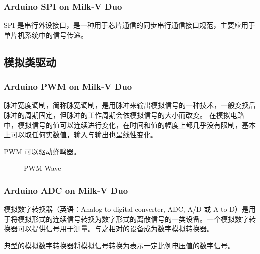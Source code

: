 \documentclass[xcolor=table,dvipsnames,svgnames,aspectratio=169]{ctexbeamer}
\begin{document}
\begin{frame}
  \frametitle{Arduino SPI on Milk-V Duo}

  SPI 是串行外设接口，是一种用于芯片通信的同步串行通信接口规范，主要应用于单片机系统中的信号传递。%


\end{frame}

\subsection{模拟类驱动}

\begin{frame}
  \frametitle{Arduino PWM on Milk-V Duo}

  脉冲宽度调制，简称脉宽调制，是用脉冲来输出模拟信号的一种技术，一般变换后脉冲的周期固定，但脉冲的工作周期会依模拟信号的大小而改变。 在模拟电路中，模拟信号的值可以连续进行变化，在时间和值的幅度上都几乎没有限制，基本上可以取任何实数值，输入与输出也呈线性变化。

  PWM 可以驱动蜂鸣器。

  \begin{figure}
    \centering
    \caption{PWM Wave}
  \end{figure}

\end{frame}

\begin{frame}
  \frametitle{Arduino ADC on Milk-V Duo}

  模拟数字转换器（英语：Analog-to-digital converter, ADC, A/D 或 A to D）是用于将模拟形式的连续信号转换为数字形式的离散信号的一类设备。一个模拟数字转换器可以提供信号用于测量。与之相对的设备成为数字模拟转换器。

  典型的模拟数字转换器将模拟信号转换为表示一定比例电压值的数字信号。

\end{frame}

\makebottom
\end{document}
